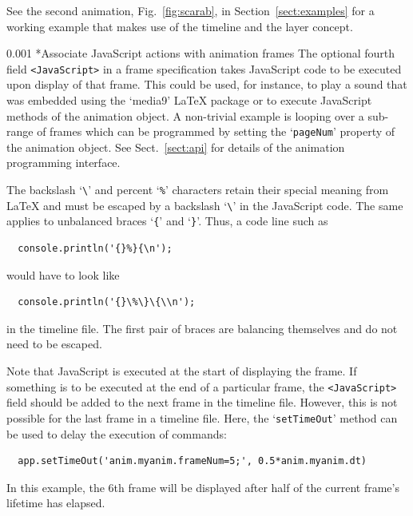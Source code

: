 \documentclass[a4paper]{article}
\makeatletter
\newcommand\myparagraph{\@startsection{paragraph}{3}{\z@}%
                                     {\parskip}%
                                     {0.001\parskip}%
                                     {\itshape\normalsize}}
\makeatother
\begin{document}
%

See the second animation, Fig.~\ref{fig:scarab}, in Section~\ref{sect:examples} for a working example that makes use of the timeline and the layer concept.

\myparagraph*{Associate JavaScript actions with animation frames}\label{sect:jsfield}
The optional fourth field \verb+<JavaScript>+ in a frame specification takes JavaScript code to be executed upon display of that frame. This could be used, for instance, to play a sound that was embedded using the `media9' \LaTeX{} package \cite{media9} or to execute JavaScript methods of the animation object. A non-trivial example is looping over a sub-range of frames which can be programmed by setting the `\verb+pageNum+' property of the animation object. See Sect.~\ref{sect:api} for details of the animation programming interface.

The backslash `\verb+\+' and percent `\verb+%+' characters retain their special meaning from \LaTeX{} and must be escaped by a backslash `\verb+\+' in the JavaScript code. The same applies to unbalanced braces `\verb+{+' and `\verb+}+'. Thus, a code line such as
\begin{verbatim}
  console.println('{}%}{\n');
\end{verbatim}
would have to look like
\begin{verbatim}
  console.println('{}\%\}\{\\n');
\end{verbatim}
in the timeline file. The first pair of braces are balancing themselves and do not need to be escaped.

Note that JavaScript is executed at the start of displaying the frame. If something is to be executed at the end of a particular frame, the \verb+<JavaScript>+ field should be added to the next frame in the timeline file. However, this is not possible for the last frame in a timeline file. Here, the `\verb+setTimeOut+' method can be used to delay the execution of commands:
\begin{verbatim}
  app.setTimeOut('anim.myanim.frameNum=5;', 0.5*anim.myanim.dt)
\end{verbatim}
In this example, the 6th frame will be displayed after half of the current frame's lifetime has elapsed.
\end{document}
